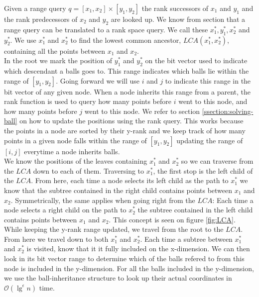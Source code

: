 Given a range query $q = [x_1, x_2] \times [y_1, y_2]$ the rank successors of $x_1$ and $y_1$ and the rank predecessors of $x_2$ and $y_2$ are looked up. We know from section  that a range query can be translated to a rank space query. We call these $x^*_1, y^*_1, x^*_2$ and $y^*_2$. We use $x^*_1$ and $x^*_2$ to find the lowest common ancestor, $LCA(x^*_1, x^*_2)$, containing all the points between $x_1$ and $x_2$. \\

In the root we mark the position of $y^*_1$ and $y^*_2$ on the bit vector used to indicate which descendant a balls goes to. This range indicates which balls lie within the range of $[y_1, y_2]$. Going forward we will use $i$ and $j$ to indicate this range in the bit vector of any given node. When  a node inherits this range from a parent, the rank function is used to query how many points before $i$ went to this node, and how many points before $j$ went to this node. We refer to section \ref{ssection:solving-ball}  on how to update the positions using the rank query. This works because the points in a node are sorted by their y-rank and we keep track of how many points in a given node falls within the range of $[y_1, y_2]$ updating the range of $[i,j]$ everytime a node inherits balls.  \\

We know the positions of the leaves containing $x^*_1$ and $x^*_2$ so we can traverse from the $LCA$ down to each of them. Traversing to $x^*_1$, the first stop is the left child of the $LCA$. From here, each time a node selects its left child as the path to $x^*_1$ we know that the subtree contained in the right child contains points between $x_1$ and $x_2$. Symmetrically, the same applies when going right from the $LCA$: Each time a node selects a right child on the path to $x^*_2$ the subtree contained in the left child contains points between $x_1$ and $x_2$. This concept is seen on figure \ref{fig:LCA}. \\

While keeping the y-rank range updated, we travel from the root to the $LCA$. From here we travel down to both $x^*_1$ and $x^*_2$. Each time a subtree between $x^*_1$ and $x^*_2$ is visited, know that it it fully included on the x-dimension. We can then look in its bit vector range to determine which of the balls refered to from this node is included in the y-dimension. For all the balls included in the y-dimension, we use the ball-inheritance structure to look up their actual coordinates in $\mathcal{O}(\lg^\epsilon n)$ time.

